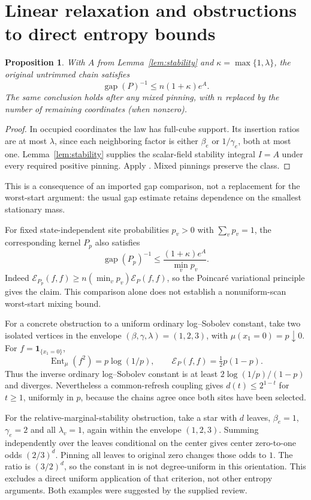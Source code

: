\documentclass[11pt]{article}
\newtheorem{proposition}[theorem]{Proposition}
\theoremstyle{remark}\newtheorem{remark}[theorem]{Remark}
\newcommand{\Ent}{\operatorname{Ent}}
\newcommand{\one}{\mathbf 1}
\begin{document}
\section{Linear relaxation and obstructions to direct entropy bounds}
\label{sec:obstructions}

\begin{proposition}\label{prop:gap}
With $A$ from Lemma~\ref{lem:stability} and
$\kappa=\max\{1,\lambda\}$, the original untrimmed chain satisfies
\[
 \operatorname{gap}(P)^{-1}\leq n(1+\kappa)e^A.
\]
The same conclusion holds after any mixed pinning, with $n$ replaced
by the number of remaining coordinates (when nonzero).
\end{proposition}
\begin{proof}
In occupied coordinates the law has full-cube support. Its insertion
ratios are at most $\lambda$, since each neighboring factor is either
$\beta_e$ or $1/\gamma_e$, both at most one.
Lemma~\ref{lem:stability} supplies the scalar-field stability integral
$I=A$ under every required positive pinning. Apply
\cite[Proposition~2.1]{MY26}. Mixed pinnings preserve the class.
\end{proof}

This is a consequence of an imported gap comparison, not a replacement
for the worst-start argument: the usual gap estimate retains dependence
on the smallest stationary mass.

For fixed state-independent site probabilities $p_v>0$ with
$\sum_vp_v=1$, the corresponding kernel $P_p$ also satisfies
\[
 \operatorname{gap}(P_p)^{-1}\leq
 \frac{(1+\kappa)e^A}{\min_vp_v}.
\]
Indeed $\mathcal E_{P_p}(f,f)\geq n(\min_vp_v)\mathcal E_P(f,f)$,
so the Poincar\'e variational principle gives the claim. This comparison
alone does not establish a nonuniform-scan worst-start mixing bound.

For a concrete obstruction to a uniform ordinary log--Sobolev constant,
take two isolated vertices in the envelope $(\beta,\gamma,\lambda)=(1,2,3)$,
with $\mu(x_1=0)=p\downarrow0$. For
$f=\one_{\{x_1=0\}}$,
\[
 \Ent_\mu(f^2)=p\log(1/p),\qquad
 \mathcal E_P(f,f)=\tfrac12p(1-p).
\]
Thus the inverse ordinary log--Sobolev constant is at least
$2\log(1/p)/(1-p)$ and diverges. Nevertheless a common-refresh coupling
gives $d(t)\leq2^{1-t}$ for $t\geq1$, uniformly in $p$, because the
chains agree once both sites have been selected.

For the relative-marginal-stability obstruction, take a star with $d$
leaves, $\beta_e=1$, $\gamma_e=2$ and all $\lambda_v=1$, again within
the envelope $(1,2,3)$. Summing independently over the leaves conditional
on the center gives center zero-to-one odds $(2/3)^d$.
Pinning all leaves to original zero changes those odds to $1$.
The ratio is $(3/2)^d$, so the constant in
\cite[Definition~1.9]{CFYZ22} is not degree-uniform in this orientation.
This excludes a direct uniform application of that criterion, not other
entropy arguments. Both examples were suggested by the supplied review.
\end{document}
